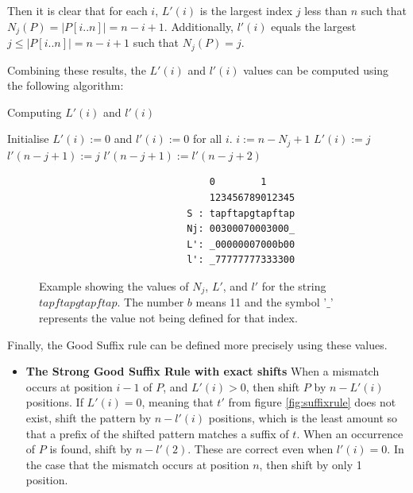 Then it is clear that for each $i$, $L'(i)$ is the largest index $j$ less than $n$ such that $N_j(P)=|P[i..n]|=n-i+1$. Additionally, $l'(i)$ equals the largest $j\leq|P[i..n]|=n-i+1$ such that $N_j(P)=j$. 

Combining these results, the $L'(i)$ and $l'(i)$ values can be computed using the following algorithm:

\begin{algorithm}
\caption{Computing $L'(i)$ and $l'(i)$}\label{alg:Lvalues}
\begin{algorithmic}
\State Initialise $L'(i):=0$ and $l'(i):=0$ for all $i$. 
        \State $i:=n-N_j+1$
        \State $L'(i):=j$
    \EndIf
\EndFor
{}
    \State $l'(n-j+1) := j$
    \Else
    \State $l'(n-j+1) := l'(n-j+2)$ 
    \EndIf
\EndFor
\end{algorithmic}
\end{algorithm}

\begin{figure}[ht!]
\begin{verbatim}
                              0        1      
                              123456789012345 
                          S : tapftapgtapftap 
                          Nj: 00300070003000_ 
                          L': _00000007000b00 
                          l': _77777777333300 
\end{verbatim}
\caption{Example showing the values of $N_j$, $L'$, and $l'$ for the string $tapftapgtapftap$. The number $b$ means 11 and the symbol '$\_$' represents the value not being defined for that index. }
\label{fig:gsr-example}
\end{figure}


Finally, the Good Suffix rule can be defined more precisely using these values. 

\begin{itemize}
    \item[] \textbf{The Strong Good Suffix Rule with exact shifts} When a mismatch occurs at position $i-1$ of $P$, and $L'(i)>0$, then shift $P$ by $n-L'(i)$ positions. If $L'(i)=0$, meaning that $t'$ from figure \ref{fig:suffixrule} does not exist, shift the pattern by $n-l'(i)$ positions, which is the least amount so that a prefix of the shifted pattern matches a suffix of $t$. When an occurrence of $P$ is found, shift by $n-l'(2)$. These are correct even when $l'(i)=0$. In the case that the mismatch occurs at position $n$, then shift by only 1 position. 
\end{itemize}


